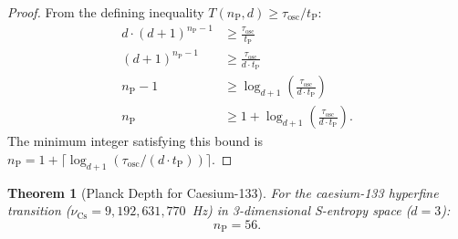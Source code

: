 \documentclass[twocolumn,10pt,a4paper]{article}
\newtheorem{theorem}{Theorem}[section]
\theoremstyle{definition}
\theoremstyle{remark}
\newcommand{\tP}{t_{\mathrm{P}}}
\newcommand{\nP}{n_{\mathrm{P}}}
\begin{document}
\begin{proof}
From the defining inequality $T(\nP, d) \geq \tau_{\mathrm{osc}} / \tP$:
\begin{align}
d \cdot (d+1)^{\nP - 1} &\geq \frac{\tau_{\mathrm{osc}}}{\tP} \nonumber \\
(d+1)^{\nP - 1} &\geq \frac{\tau_{\mathrm{osc}}}{d \cdot \tP} \nonumber \\
\nP - 1 &\geq \log_{d+1}\!\left(\frac{\tau_{\mathrm{osc}}}{d \cdot \tP}\right) \nonumber \\
\nP &\geq 1 + \log_{d+1}\!\left(\frac{\tau_{\mathrm{osc}}}{d \cdot \tP}\right).
\end{align}
The minimum integer satisfying this bound is $\nP = 1 + \lceil \log_{d+1}(\tau_{\mathrm{osc}} / (d \cdot \tP)) \rceil$.
\end{proof}

\begin{theorem}[Planck Depth for Caesium-133]
\label{thm:caesium}
For the caesium-133 hyperfine transition ($\nu_{\mathrm{Cs}} = 9{,}192{,}631{,}770$~Hz) in 3-dimensional S-entropy space ($d = 3$):
\begin{equation}
\nP = 56.
\end{equation}
\end{theorem}
\end{document}
